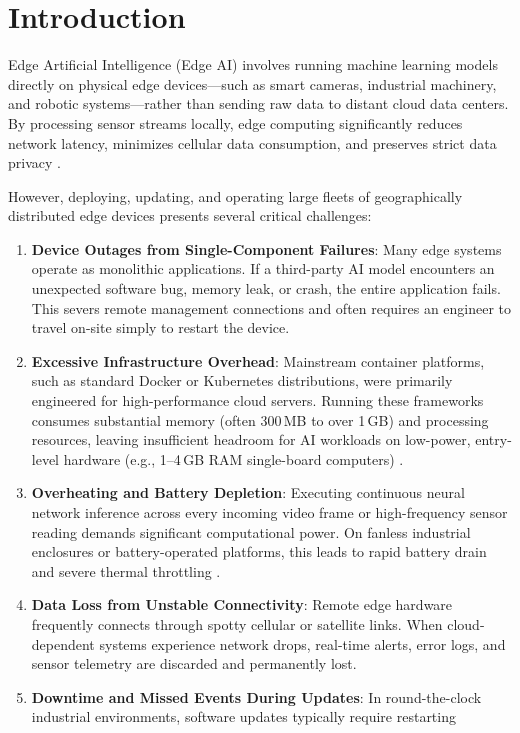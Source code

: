 \documentclass[conference]{IEEEtran}
\begin{document}
    \section{Introduction}
    Edge Artificial Intelligence (Edge AI) involves running machine learning models directly on physical edge devices---such as smart cameras, industrial 
    machinery, and robotic systems---rather than sending raw data to distant cloud data centers. By processing sensor streams locally, edge computing significantly
    reduces network latency, minimizes cellular data consumption, and preserves strict data privacy \cite{b1, b4}.

    However, deploying, updating, and operating large fleets of geographically distributed edge devices presents several critical challenges:
    \begin{enumerate}
        \item \textbf{Device Outages from Single-Component Failures}: Many edge systems operate as monolithic applications. If a third-party AI model encounters an
        unexpected software bug, memory leak, or crash, the entire application fails. This severs remote management connections and often requires an engineer to
        travel on-site simply to restart the device.
        \item \textbf{Excessive Infrastructure Overhead}: Mainstream container platforms, such as standard Docker or Kubernetes distributions, were primarily
        engineered for high-performance cloud servers. Running these frameworks consumes substantial memory (often 300\,MB to over 1\,GB) and processing resources,
        leaving insufficient headroom for AI workloads on low-power, entry-level hardware (e.g., 1--4\,GB RAM single-board computers) \cite{b6, b7}.
        \item \textbf{Overheating and Battery Depletion}: Executing continuous neural network inference across every incoming video frame or high-frequency sensor
        reading demands significant computational power. On fanless industrial enclosures or battery-operated platforms, this leads to rapid battery drain and 
        severe thermal throttling \cite{b5}.
        \item \textbf{Data Loss from Unstable Connectivity}: Remote edge hardware frequently connects through spotty cellular or satellite links. When
        cloud-dependent systems experience network drops, real-time alerts, error logs, and sensor telemetry are discarded and permanently lost.
        \item \textbf{Downtime and Missed Events During Updates}: In round-the-clock industrial environments, software updates typically require restarting

\end{enumerate}
\end{document}
